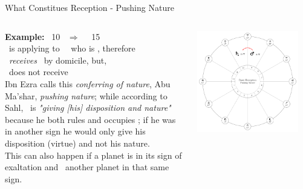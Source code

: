 \begin{frame}[t]{What Constitues Reception - Pushing Nature}
\begin{columns}[T, onlytextwidth]
\textbf{Example:} \Mars\ 10 \Aries\ $\Rightarrow$ \Conjunction\ \Saturn\ 15 \Aries\footnotemark[1] \\
\ul
\vspace{0.2cm}
\Mars\ is applying to \Conjunction\ \Saturn\ who is \Aries, therefore\\
\Mars\ \textsl{receives} \Saturn\ by domicile, but, \\
\Saturn\ does not receive \Mars\  \\

\vspace{0.2cm}
Ibn Ezra calls this \textsl{conferring of nature}, Abu Ma'shar, \textsl{pushing nature}; while according to Sahl, \Mars\ is \textsl{"giving [his] disposition and nature"} because he both rules and occupies \Aries; if he was in another sign he would only give his disposition (virtue) and not his nature.\footnotemark[2] \\

This can also happen if a planet is in its sign of exaltation and \Conjunction\ another planet in that same sign.


\vspace{-0.5cm}
\begin{center}
{\includegraphics[width=0.9\textwidth]{charts/01-A-receives}} \\
\end{center}

\end{columns}
\vspace{0.2cm}
\end{frame}
